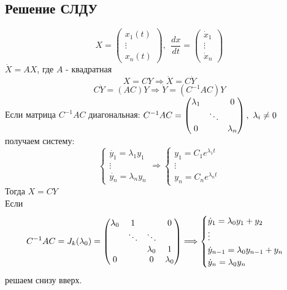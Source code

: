     \subsection{Решение СЛДУ}
    $$X = \begin{pmatrix}
        x_1(t)\\
        \vdots\\
        x_n(t)
    \end{pmatrix} , \ \ \frac{dx}{dt} = \begin{pmatrix}
        \dot{x}_1 \\
        \vdots\\
        \dot{x}_n
    \end{pmatrix}$$
    $\dot{X} = AX$, где $A$ - квадратная
    $$X = CY \Longrightarrow \dot{X} = C\dot{Y}$$
    $$C\dot{Y} = (AC)Y \Longrightarrow \dot{Y} = (C^{-1}AC)Y$$
    Если матрица $C^{-1}AC$ диагональная: $C^{-1}AC = \begin{pmatrix}
        \lambda_1 & \null & 0\\
        \null & \ddots & \\
        0 & \null & \lambda_n
    \end{pmatrix}, \ \lambda_i \neq 0$ получаем систему: 
    $$\begin{cases}
        \dot{y_1} = \lambda_1 y_1\\
        \vdots \\
        \dot{y_n} = \lambda_n y_n
    \end{cases} \Longrightarrow \begin{cases}
        y_1 = C_1e^{\lambda_1t}\\
        \vdots \\
        y_n = C_ne^{\lambda_nt}
    \end{cases}$$
    Тогда $X = CY$\\
    Если $$C^{-1}AC = J_k(\lambda_0) = \begin{pmatrix}
        \lambda_0 & 1 & \null & 0 \\
        \null & \ddots & \ddots & \null \\
        \null & \null & \lambda_{0} & 1 \\
        0 & \null & 0 & \lambda_0
    \end{pmatrix} \Longrightarrow \begin{cases}
        \dot{y}_1 = \lambda_0y_1 + y_2\\
        \vdots \\
        \dot{y}_{n-1} = \lambda_0y_{n-1} + y_n\\
        \dot{y}_n = \lambda_0y_n
    \end{cases}$$
    решаем снизу вверх.
